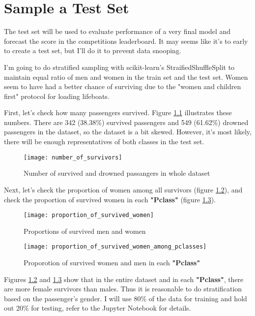 \chapter{Sample a Test Set}
The test set will be used to evaluate performance of a very final model
and forecast the score in the competitions leaderboard. It may seems like
it's to early to create a test set, but I'll do it to prevent data snooping.

I'm going to do stratified sampling with scikit-learn's StraifiedShuffleSplit
to maintain equal ratio of men and women in the train set and the test set.
Women seem to have had a better chance of surviving due to the "women and
children first" protocol for loading lifeboats.

First, let's check how many passengers survived. Figure 
\ref{number_of_survivors} illustrates these numbers. There are 342 (38.38\%)
survived passengers and 549 (61.62\%) drowned passengers in the dataset, 
so the dataset is a bit skewed. However, it's most likely, there will be 
enough representatives of both classes in the test set.

\begin{figure}[!ht]
	\centering
	\texttt{[image: number\_of\_survivors]}
	\caption{Number of survived and drowned passangers in whole dataset}
	\label{number_of_survivors}
\end{figure}

Next, let's check the proportion of women among all survivors (figure
\ref{proportion_of_survived_women}), and check the proportion of survived
women in each \textbf{"Pclass"} (figure 
\ref{proportion_of_survived_women_among_pclasses}).

\begin{figure}[!ht]
	\centering
	\texttt{[image: proportion\_of\_survived\_women]}
	\caption{Proportions of survived men and women}
	\label{proportion_of_survived_women}
\end{figure}

\begin{figure}[!ht]
	\centering
	\texttt{[image: proportion\_of\_survived\_women\_among\_pclasses]}
	\caption{Proporotion of survived women and men in each \textbf{"Pclass"}}
	\label{proportion_of_survived_women_among_pclasses}
\end{figure}

Figures \ref{proportion_of_survived_women} and 
\ref{proportion_of_survived_women_among_pclasses} show that in the entire 
dataset and in each \textbf{"Pclass"}, there are more female survivors 
than males. Thus it is reasonable to do stratification based on the
passenger's gender. I will use 80\% of the data for training and hold 
out 20\% for testing, refer to the Jupyter Notebook for details.